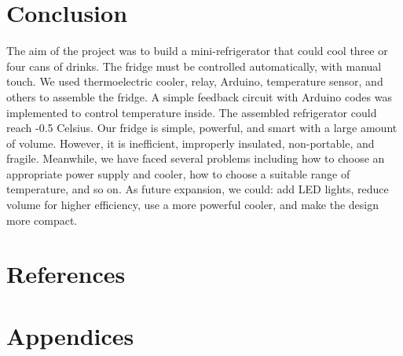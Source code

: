 \documentclass[12pt,onecolumn]{article}
\begin{document}
\section{Conclusion}
The aim of the project was to build a mini-refrigerator that could cool three or four cans of drinks. The fridge must be controlled automatically, with manual touch. We used thermoelectric cooler, relay, Arduino, temperature sensor, and others to assemble the fridge. A simple feedback circuit with Arduino codes was implemented to control temperature inside. The assembled refrigerator could reach -0.5 Celsius. Our fridge is simple, powerful, and smart with a large amount of volume. However, it is inefficient, improperly insulated, non-portable, and fragile. Meanwhile, we have faced several problems including how to choose an appropriate power supply and cooler, how to choose a suitable range of temperature, and so on. As future expansion, we could: add LED lights, reduce volume for higher efficiency, use a more powerful cooler, and make the design more compact.

\section{References}

\newpage
\section{Appendices}

\end{document}
